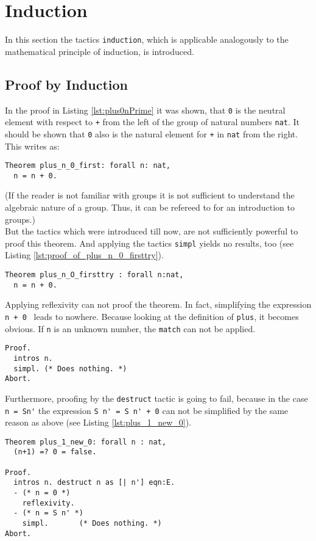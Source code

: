 \section{Induction}
In this section the tactics \lstinline!induction!, which is applicable analogously to the mathematical principle of induction, is introduced.

\subsection{Proof by Induction}
In the proof in Listing \ref{lst:plus0nPrime} it was shown, 
that \lstinline!0! is the neutral element with respect to \lstinline!+! from the left of the group of natural numbers \lstinline!nat!. 
It should be shown that \lstinline!0! also is the natural element for \lstinline!+! in \lstinline!nat! from the right. 
This writes as:
\begin{lstlisting}[caption = \lstinline!plus_n_0_first!, label= lst:plus_n_0_first]
Theorem plus_n_0_first: forall n: nat,
  n = n + 0.  
\end{lstlisting}
(If the reader is not familiar with groups it is not sufficient to understand the algebraic nature of a group.
 Thus, it can be refereed to \cite{S} for an introduction to groups.)\\
But the tactics which were introduced till now, are not sufficiently powerful to proof this theorem.
And applying the tactics \lstinline!simpl! yields no results, too (see Listing \ref{lst:proof_of_plus_n_0_firsttry}).
\begin{lstlisting}[caption = \lstinline!plus_n_O_firsttry!, label=lst:plus_n_0_firsttry] 
Theorem plus_n_O_firsttry : forall n:nat,
  n = n + 0.
\end{lstlisting}

Applying reflexivity can not proof the theorem. In fact, simplifying the expression \lstinline!n + 0 ! leads to nowhere.
Because looking at the definition of \lstinline!plus!, it becomes obvious.
If \lstinline!n! is an unknown number, the \lstinline!match! can not be applied.
  
\begin{lstlisting}[caption= \lstinline!Proof! of \lstinline!plus_n_0_firsttry!, label = lst:proof_of_plus_n_0_firsttry]
Proof.
  intros n.
  simpl. (* Does nothing. *)
Abort.
\end{lstlisting}

Furthermore, proofing by the \lstinline!destruct! tactic is going to fail, because in the case \lstinline!n = Sn'! the expression \lstinline!S n' = S n' + 0! can not be simplified by the same reason as above (see Listing \ref{lst:plus_1_new_0}).
\begin{lstlisting}[caption = \lstinline!plus_1_new_0!, label = lst:plus_1_new_0]
Theorem plus_1_new_0: forall n : nat,
  (n+1) =? 0 = false. 
 
Proof.
  intros n. destruct n as [| n'] eqn:E.
  - (* n = 0 *)
    reflexivity. 
  - (* n = S n' *)
    simpl.       (* Does nothing. *)
Abort.
\end{lstlisting}

